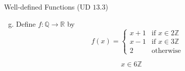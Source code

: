 \begin{frame}{}
  \begin{exampleblock}{Well-defined Functions (UD $13.3$)}
    \begin{enumerate}[(a)]
      \setcounter{enumi}{6}
      \item Define $f: \mathbb{Q} \to \mathbb{R}$ by
	\[
	  f(x) = \left\{\begin{array}{lr}
	    x + 1 & \text{if } x \in 2 \mathbb{Z} \\
	    x - 1 & \text{if } x \in 3 \mathbb{Z} \\
	    2     & \text{otherwise}
	  \end{array}\right.
	\]
    \end{enumerate}
  \end{exampleblock}

  \pause
  \[
    x \in 6 \mathbb{Z}
  \]
\end{frame}
